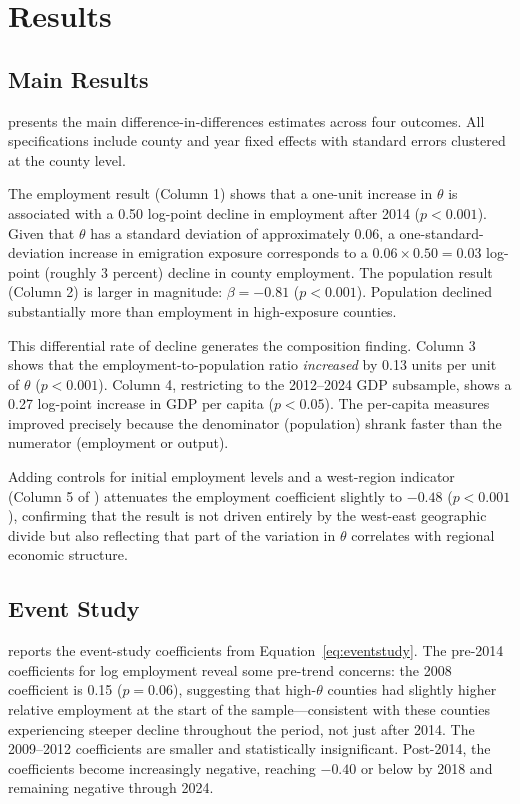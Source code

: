 \documentclass[12pt]{article}
\begin{document}
\section{Results}

\subsection{Main Results}

 presents the main difference-in-differences estimates across four outcomes. All specifications include county and year fixed effects with standard errors clustered at the county level.



The employment result (Column 1) shows that a one-unit increase in $\theta$ is associated with a 0.50 log-point decline in employment after 2014 ($p < 0.001$). Given that $\theta$ has a standard deviation of approximately 0.06, a one-standard-deviation increase in emigration exposure corresponds to a $0.06 \times 0.50 = 0.03$ log-point (roughly 3 percent) decline in county employment. The population result (Column 2) is larger in magnitude: $\beta = -0.81$ ($p < 0.001$). Population declined substantially more than employment in high-exposure counties.

This differential rate of decline generates the composition finding. Column 3 shows that the employment-to-population ratio \textit{increased} by 0.13 units per unit of $\theta$ ($p < 0.001$). Column 4, restricting to the 2012--2024 GDP subsample, shows a 0.27 log-point increase in GDP per capita ($p < 0.05$). The per-capita measures improved precisely because the denominator (population) shrank faster than the numerator (employment or output).

Adding controls for initial employment levels and a west-region indicator (Column 5 of ) attenuates the employment coefficient slightly to $-0.48$ ($p < 0.001$), confirming that the result is not driven entirely by the west-east geographic divide but also reflecting that part of the variation in $\theta$ correlates with regional economic structure.

\subsection{Event Study}

 reports the event-study coefficients from Equation~\eqref{eq:eventstudy}. The pre-2014 coefficients for log employment reveal some pre-trend concerns: the 2008 coefficient is 0.15 ($p = 0.06$), suggesting that high-$\theta$ counties had slightly higher relative employment at the start of the sample---consistent with these counties experiencing steeper decline throughout the period, not just after 2014. The 2009--2012 coefficients are smaller and statistically insignificant. Post-2014, the coefficients become increasingly negative, reaching $-0.40$ or below by 2018 and remaining negative through 2024.
\end{document}
